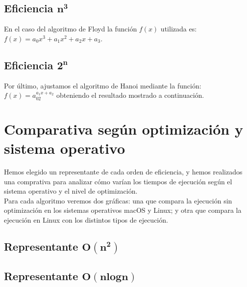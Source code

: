 \documentclass[11pt]{article}
\begin{document}
\begin{center}
	
\end{center}


\subsection*{Eficiencia $\boldsymbol{n^3}$}

En el caso del algoritmo de Floyd la función $f(x)$ utilizada es: $f(x) = a_0x^3 + a_1x^2 + a_2x + a_3$.

\begin{center}
	
\end{center}


\subsection*{Eficiencia $\boldsymbol{2^n}$}

Por último, ajustamos el algoritmo de Hanoi mediante la función: $f(x) = a_02^{a_{1}x + a_2}$ obteniendo el resultado mostrado a continuación.
 
\begin{center}
	
\end{center}


\section*{Comparativa según optimización y sistema operativo}
Hemos elegido un representante de cada orden de eficiencia, y hemos realizados una comprativa para analizar cómo varían los tiempos de ejecución según el sistema operativo y el nivel de optimización.\\

Para cada algoritmo veremos dos gráficas: una que compara la ejecución sin optimización en los sistemas operativos macOS y Linux; y otra que compara la ejecución en Linux con los distintos tipos de ejecución.

\subsection*{Representante $\boldsymbol{O(n^2)}$}

\subsection*{Representante $\boldsymbol{O(n log n)}$}
\end{document}
